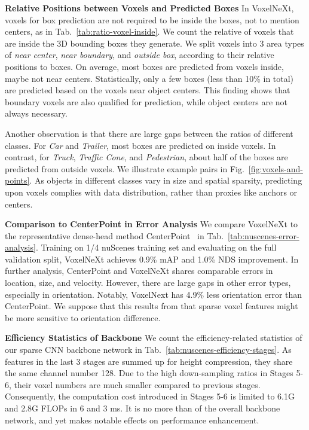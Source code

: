 \documentclass[10pt,twocolumn,letterpaper]{article}
\begin{document}
{\vspace{0.5em}
\noindent
\textbf{Relative Positions between Voxels and Predicted Boxes}
In VoxelNeXt, voxels for box prediction are not required to be inside the boxes, not to mention centers, as in Tab.~\ref{tab:ratio-voxel-inside}. We count the relative of voxels that are inside the 3D bounding boxes they generate. We split voxels into 3 area types of {\em near center}, {\em near boundary}, and {\em outside box}, according to their relative positions to boxes. On average, most boxes are predicted from voxels inside, maybe not near centers. Statistically, only a few boxes (less than 10\% in total) are predicted based on the voxels near object centers. This finding shows that boundary voxels are also qualified for prediction, while object centers are not always necessary.

Another observation is that there are large gaps between the ratios of different classes. For {\em Car} and {\em Trailer}, most boxes are predicted on inside voxels. In contrast, for {\em Truck}, {\em Traffic Cone}, and {\em Pedestrian}, about half of the boxes are predicted from outside voxels. We illustrate example pairs in Fig.~\ref{fig:voxels-and-points}. As objects in different classes vary in size and spatial sparsity, predicting upon voxels complies with data distribution, rather than proxies like anchors or centers.

\vspace{0.5em}
\noindent
\textbf{Comparison to CenterPoint in Error Analysis}
We compare VoxelNeXt to the representative dense-head method
CenterPoint~\cite{centerpoint} in Tab.~\ref{tab:nuscenes-error-analysis}. Training on 1/4 nuScenes training set and evaluating on the full validation split, VoxelNeXt achieves 0.9\% mAP and 1.0\% NDS improvement. In further analysis, CenterPoint and VoxelNeXt shares comparable errors in location, size, and velocity. However, there are large gaps in other error types, especially in orientation. Notably, VoxelNext has 4.9\% less orientation error than CenterPoint. We suppose that this results from that sparse voxel features might be more sensitive to orientation difference.


\vspace{0.5em}
\noindent
\textbf{Efficiency Statistics of Backbone}
We count the efficiency-related statistics of our sparse CNN backbone network in Tab.~\ref{tab:nuscenes-efficiency-stages}. As features in the last 3 stages are summed up for height compression, they share the same channel number 128. Due to the high down-sampling ratios in Stages 5-6, their voxel numbers are much smaller compared to previous stages. Consequently, the computation cost introduced in Stages 5-6 is limited to 6.1G and 2.8G FLOPs in 6 and 3 ms. It is no more than  of the overall backbone network, and yet makes notable effects on performance enhancement.

}
\end{document}
